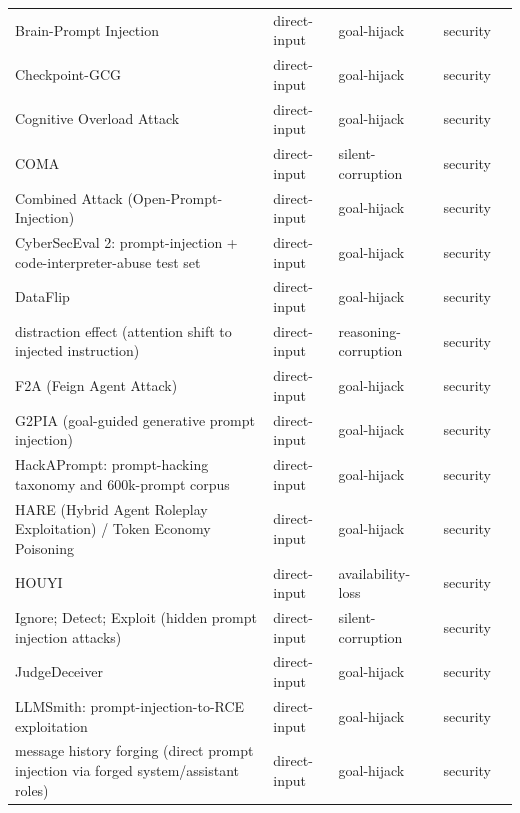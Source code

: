 \begin{longtable}{@{}>{\raggedright\arraybackslash}p{}llll@{}}
Brain-Prompt Injection & direct-input & goal-hijack & security & \cite{tai-2026-brainprompt} \\
Checkpoint-GCG & direct-input & goal-hijack & security & \cite{yang-2025-checkpointgcg} \\
Cognitive Overload Attack & direct-input & goal-hijack & security & \cite{upadhayay-2024-cognitive} \\
COMA & direct-input & silent-corruption & security & \cite{liu-2025-compression} \\
Combined Attack (Open-Prompt-Injection) & direct-input & goal-hijack & security & \cite{liu-2023-formalizing} \\
CyberSecEval 2: prompt-injection + code-interpreter-abuse test set & direct-input & goal-hijack & security & \cite{bhatt-2024-cyberseceval} \\
DataFlip & direct-input & goal-hijack & security & \cite{choudhary-2025-not} \\
distraction effect (attention shift to injected instruction) & direct-input & reasoning-corruption & security & \cite{hung-2024-attention} \\
F2A (Feign Agent Attack) & direct-input & goal-hijack & security & \cite{ren-2024-f2a} \\
G2PIA (goal-guided generative prompt injection) & direct-input & goal-hijack & security & \cite{zhang-2024-goalguided} \\
HackAPrompt: prompt-hacking taxonomy and 600k-prompt corpus & direct-input & goal-hijack & security & \cite{schulhoff-2023-ignore} \\
HARE (Hybrid Agent Roleplay Exploitation) / Token Economy Poisoning & direct-input & goal-hijack & security & \cite{muhil-2025-evaluating} \\
HOUYI & direct-input & availability-loss & security & \cite{liu-2023-promptb} \\
Ignore; Detect; Exploit (hidden prompt injection attacks) & direct-input & silent-corruption & security & \cite{collu-2025-misleading} \\
JudgeDeceiver & direct-input & goal-hijack & security & \cite{shi-2024-optimizationbased} \\
LLMSmith: prompt-injection-to-RCE exploitation & direct-input & goal-hijack & security & \cite{liu-2023-demystifying} \\
message history forging (direct prompt injection via forged system/assistant roles) & direct-input & goal-hijack & security & \cite{kaya-2025-meets} \\

\end{longtable}
